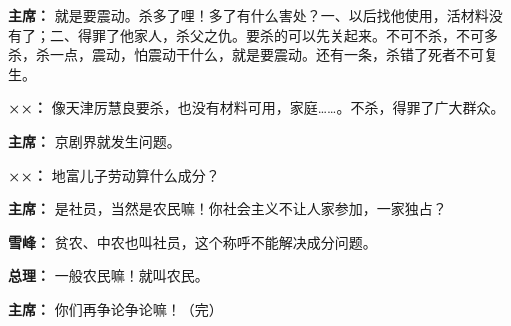 \begin{duihua}
\item[\textbf{主席：}] 就是要震动。杀多了哩！多了有什么害处？一、以后找他使用，活材料没有了；二、得罪了他家人，杀父之仇。要杀的可以先关起来。不可不杀，不可多杀，杀一点，震动，怕震动干什么，就是要震动。还有一条，杀错了死者不可复生。

\item[\textbf{××：}] 像天津厉慧良要杀，也没有材料可用，家庭……。不杀，得罪了广大群众。

\item[\textbf{主席：}] 京剧界就发生问题。

\item[\textbf{××：}] 地富儿子劳动算什么成分？

\item[\textbf{主席：}] 是社员，当然是农民嘛！你社会主义不让人家参加，一家独占？

\item[\textbf{雪峰：}] 贫农、中农也叫社员，这个称呼不能解决成分问题。

\item[\textbf{总理：}] 一般农民嘛！就叫农民。

\item[\textbf{主席：}] 你们再争论争论嘛！（完）
\end{duihua}

